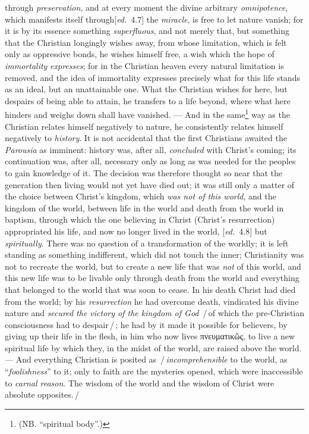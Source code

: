 \documentclass[12pt,a4paper,openany]{book}
\newcommand{\kpage}[1]{\marginnote{\footnotesize\textit{[#1]}}}
\newcommand{\ed}[1]{{\small[\textit{ed.}\ #1]}}
\newcommand{\ins}[1]{\,/\,#1\,/\,}
\begin{document}
through \emph{preservation}, and at every moment the divine
arbitrary \emph{omnipotence}, which manifests itself through\ed{4.7} the \emph{miracle}, is free
to let nature vanish; for it is by its essence something \emph{superfluous}, and
not merely that, but something that the Christian longingly wishes
away, from whose limitation, which is felt only as oppressive
bonds, he wishes himself free, a wish which the hope of \emph{immortality}
\emph{expresses}; for in the Christian heaven every natural limitation is
removed, and the idea of immortality expresses precisely\kpage{90}
what for this life stands as an ideal, but an unattainable one.
What the Christian wishes for here, but despairs of being able to attain,
he transfers to a life beyond, where what here hinders and
weighs down shall have vanished. --- And in the same\footnote[18]{(NB. ``spiritual body''.)} way as the
Christian relates himself negatively to nature, he consistently relates himself
negatively to \emph{history}. It is not accidental that the first Christians
awaited the \emph{Parousia} as imminent: history was, after all, \emph{concluded}
with Christ's coming; its continuation was, after all, necessary only as long
as was needed for the peoples to gain knowledge of
it. The decision was therefore thought so near that the generation then living
would not yet have died out; it was still only a matter of the choice
between Christ's kingdom, which \emph{was not of this world}, and the kingdom of the world, between
life in the world and death from the world in baptism, through which
the one believing in Christ (Christ's resurrection) appropriated his
life, and now no longer lived in the world, \ed{4.8} but \emph{spiritually}. There was
no question of a transformation of the worldly; it is left standing
as something indifferent, which did not touch the inner; Christianity
was not to recreate the world, but to create a new life that was \emph{not}
of this world, and this new life was to be livable only through death
from the world and everything that belonged to the world that was soon to
cease. In his death Christ had died from the world; by his \emph{resurrection}
he had overcome death, vindicated his divine
nature and \emph{secured the victory of the kingdom of God} \ins{of which the pre-Christian consciousness
had to despair}; he had by it made it possible for
believers, by giving up their life in the flesh, in him who now lives
πνευματικῶς, to live a new spiritual life by which they, in the midst of the world,
are raised above the world. --- And everything Christian is posited as \ins{\emph{incomprehensible}
to the world, as ``\emph{foolishness}'' to it; only to faith are the mysteries
opened, which were inaccessible to \emph{carnal reason}. The wisdom of the world
and the wisdom of Christ were absolute opposites.}
\end{document}
